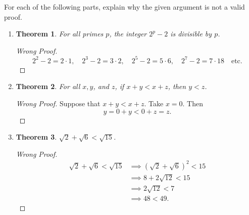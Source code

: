 \documentclass{article}
\newtheorem*{theorem}{Theorem}
\theoremstyle{definition}
\begin{document}
\begin{question}{6}
    For each of the following parts, explain why the given argument is not a valid proof.
    \begin{enumerate}
        \item \begin{theorem} For all primes $p$, the integer $2^p-2$ is divisible by $p$.
        		\end{theorem}
		\begin{proof}[Wrong Proof] 
		\[
		2^2 - 2 = 2 \cdot 1, \quad  2^3 - 2 = 3 \cdot 2, \quad 2^5 - 2 = 5 \cdot 6, \quad 2^7 - 2 = 7 \cdot 18 \quad \text{etc.}
		\]
		\end{proof}
		
	\item \begin{theorem} For all $x, y$, and $z$, if $x+y <  x+z$, then $y < z$.
        		\end{theorem}
		\begin{proof}[Wrong Proof] 
		Suppose that $x+y <  x+z$. Take $x=0$. Then 
		\[
		y = 0 + y < 0 + z = z.
		\]
		\end{proof}
		
	\item \begin{theorem} $\sqrt{2} + \sqrt{6}  <  \sqrt{15}$.
        		\end{theorem}
		\begin{proof}[Wrong Proof] 
		\begin{align*}
		\sqrt{2} + \sqrt{6}  <  \sqrt{15} &\implies (\sqrt{2} + \sqrt{6})^2  <  15\\
		&\implies 8 + 2\sqrt{12} < 15\\
		&\implies 2\sqrt{12} < 7\\
		&\implies 48 < 49.
		\end{align*}
		\end{proof}
    \end{enumerate}
\end{question}
\begin{solution}
\end{solution}
\end{document}
